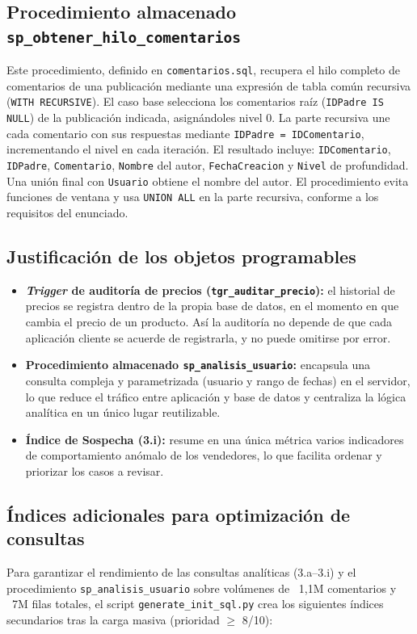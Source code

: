 \documentclass[11pt, a4paper]{article}
\begin{document}
\subsection{Procedimiento almacenado \texttt{sp\_obtener\_hilo\_comentarios}}
Este procedimiento, definido en \texttt{comentarios.sql}, recupera el hilo completo de comentarios de una publicación mediante una expresión de tabla común recursiva (\texttt{WITH RECURSIVE}). El caso base selecciona los comentarios raíz (\texttt{IDPadre IS NULL}) de la publicación indicada, asignándoles nivel 0. La parte recursiva une cada comentario con sus respuestas mediante \texttt{IDPadre = IDComentario}, incrementando el nivel en cada iteración. El resultado incluye: \texttt{IDComentario}, \texttt{IDPadre}, \texttt{Comentario}, \texttt{Nombre} del autor, \texttt{FechaCreacion} y \texttt{Nivel} de profundidad. Una unión final con \texttt{Usuario} obtiene el nombre del autor. El procedimiento evita funciones de ventana y usa \texttt{UNION ALL} en la parte recursiva, conforme a los requisitos del enunciado.

\subsection{Justificación de los objetos programables}
\begin{itemize}[leftmargin=1.5em]
    \item \textbf{\textit{Trigger} de auditoría de precios (\texttt{tgr\_auditar\_precio}):} el historial de precios se registra dentro de la propia base de datos, en el momento en que cambia el precio de un producto. Así la auditoría no depende de que cada aplicación cliente se acuerde de registrarla, y no puede omitirse por error.
    \item \textbf{Procedimiento almacenado \texttt{sp\_analisis\_usuario}:} encapsula una consulta compleja y parametrizada (usuario y rango de fechas) en el servidor, lo que reduce el tráfico entre aplicación y base de datos y centraliza la lógica analítica en un único lugar reutilizable.
    \item \textbf{Índice de Sospecha (3.i):} resume en una única métrica varios indicadores de comportamiento anómalo de los vendedores, lo que facilita ordenar y priorizar los casos a revisar.
\end{itemize}

\subsection{Índices adicionales para optimización de consultas}
\label{sec:indices}
Para garantizar el rendimiento de las consultas analíticas (3.a--3.i) y el procedimiento \texttt{sp\_analisis\_usuario} sobre volúmenes de ~1,1M comentarios y ~7M filas totales, el script \texttt{generate\_init\_sql.py} crea los siguientes índices secundarios tras la carga masiva (prioridad $\ge$ 8/10):
\end{document}
